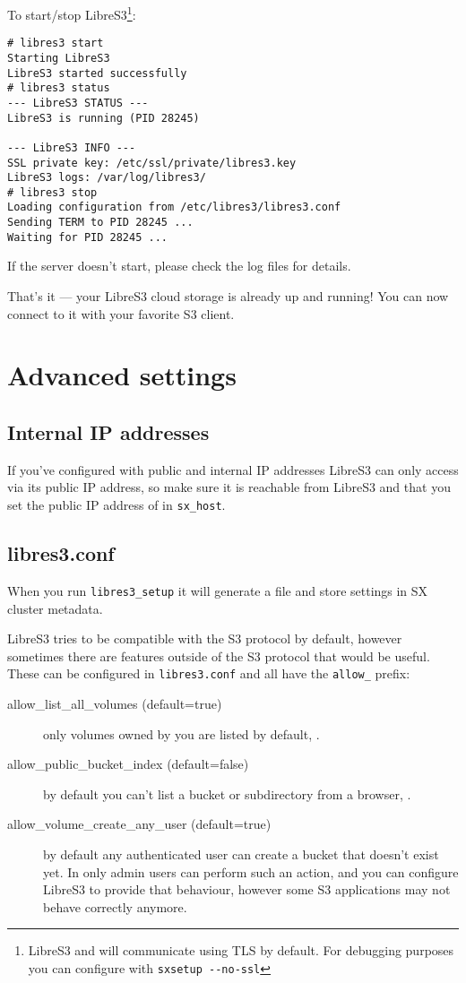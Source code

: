 To start/stop LibreS3\footnote{LibreS3 and \SX will communicate using TLS by
default. For debugging purposes you can configure \SX with \texttt{sxsetup -{}-no-ssl}}:

\begin{lstlisting}
# libres3 start
Starting LibreS3
LibreS3 started successfully
# libres3 status
--- LibreS3 STATUS ---
LibreS3 is running (PID 28245)

--- LibreS3 INFO ---
SSL private key: /etc/ssl/private/libres3.key
LibreS3 logs: /var/log/libres3/
# libres3 stop
Loading configuration from /etc/libres3/libres3.conf
Sending TERM to PID 28245 ... 
Waiting for PID 28245 ...
\end{lstlisting}


If the server doesn't start, please check the log files for details.

That's it --- your LibreS3 cloud storage is already up and running!
You can now connect to it with your favorite S3 client.

\section{Advanced settings}

\subsection{Internal IP addresses}

If you've configured \SX with public and internal IP addresses LibreS3 can only
access \SX via its public IP address, so make sure it is reachable from LibreS3
and that you set the public IP address of \SX in \verb|sx_host|.

\subsection{libres3.conf}

When you run \verb|libres3_setup| it will generate a file
 and store settings in SX cluster metadata.

LibreS3 tries to be compatible with the S3 protocol by default, however
sometimes there are features outside of the S3 protocol that would be useful.
These can be configured in \verb|libres3.conf| and all have the \verb|allow_| prefix:
\begin{description}
\item[allow\_list\_all\_volumes (default=true)] only volumes owned by you are
  listed by default, .
\item[allow\_public\_bucket\_index (default=false)] by default you can't list a
  bucket or subdirectory from a browser, .
\item [allow\_volume\_create\_any\_user (default=true)] by default any authenticated
  user can create a bucket that doesn't exist yet. In \SX only admin users can
  perform such an action, and you can configure LibreS3 to provide that
  behaviour, however some S3 applications may not behave correctly anymore.
\end{description}

